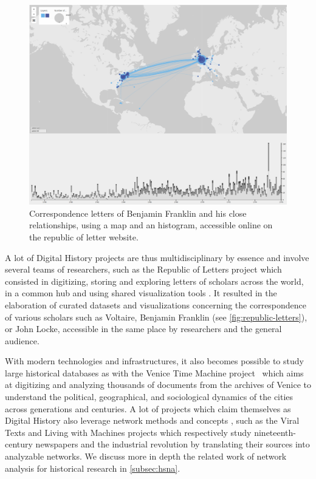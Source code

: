 \begin{figure}
    \centering %
    \includegraphics[width=1\textwidth]{static/figures/RelatedWork/RepublicOfLetter_BenjFranklin}
    \caption{Correspondence letters of Benjamin Franklin and his close relationships, using a map and an histogram, accessible online on the republic of letter website.}
    \label{fig:republic-letters}
\end{figure}

A lot of Digital History projects are thus multidisciplinary by essence and involve several teams of researchers, such as the Republic of Letters project which consisted in digitizing, storing and exploring letters of scholars across the world, in a common hub and using shared visualization tools \cite{edelsteinHistoricalResearchDigital2017}.
It resulted in the elaboration of curated datasets and visualizations concerning the correspondence of various scholars such as Voltaire, Benjamin Franklin (see \autoref{fig:republic-letters}), or John Locke, accessible in the same place by researchers and the general audience.

With modern technologies and infrastructures, it also becomes possible to study large historical databases as with the Venice Time Machine project~\cite{kaplanVeniceTimeMachine2015} which aims at digitizing and analyzing thousands of documents from the archives of Venice to understand the political, geographical, and sociological dynamics of the cities across generations and centuries.
A lot of projects which claim themselves as Digital History also leverage network methods and concepts \cite{ahnertNetworkTurnChanging2020}, such
as the Viral Texts \cite{cordell2017viral} and Living with Machines \cite{ardanuyLivingMachinesStudy2020} projects which respectively study nineteenth-century newspapers and the industrial revolution by translating their sources into analyzable networks.
We discuss more in depth the related work of network analysis for historical research in \autoref{subsec:hsna}.



